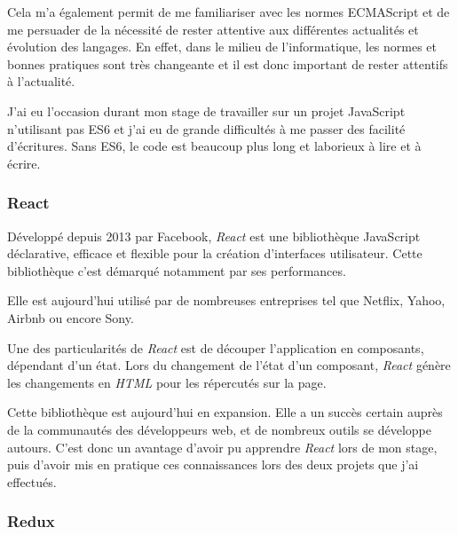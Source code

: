 \bigskip

Cela m'a également permit de me familiariser avec les normes ECMAScript
et de me persuader de la nécessité de rester attentive aux différentes
actualités et évolution des langages. En effet, dans le milieu de
l'informatique, les normes et bonnes pratiques sont très changeante et
il est donc important de rester attentifs à l'actualité.

\bigskip

J'ai eu l'occasion durant mon stage de travailler sur un projet
JavaScript n'utilisant pas ES6 et j'ai eu de grande difficultés à me
passer des facilité d'écritures. Sans ES6, le code est beaucoup plus
long et laborieux à lire et à écrire.

\bigskip

\subsubsection{React}\label{react}

\bigskip

Développé depuis 2013 par Facebook, \emph{React} est une bibliothèque
JavaScript déclarative, efficace et flexible pour la création
d'interfaces utilisateur. Cette bibliothèque c'est démarqué notamment
par ses performances.

\bigskip

Elle est aujourd'hui utilisé par de nombreuses entreprises tel que
Netflix, Yahoo, Airbnb ou encore Sony.

\bigskip

Une des particularités de \emph{React} est de découper l'application en
composants, dépendant d'un état. Lors du changement de l'état d'un
composant, \emph{React} génère les changements en \emph{HTML} pour les
répercutés sur la page.

\bigskip

Cette bibliothèque est aujourd'hui en expansion. Elle a un succès
certain auprès de la communautés des développeurs web, et de nombreux
outils se développe autours. C'est donc un avantage d'avoir pu apprendre
\emph{React} lors de mon stage, puis d'avoir mis en pratique ces
connaissances lors des deux projets que j'ai effectués.

\bigskip

\subsubsection{Redux}\label{redux}

\bigskip

